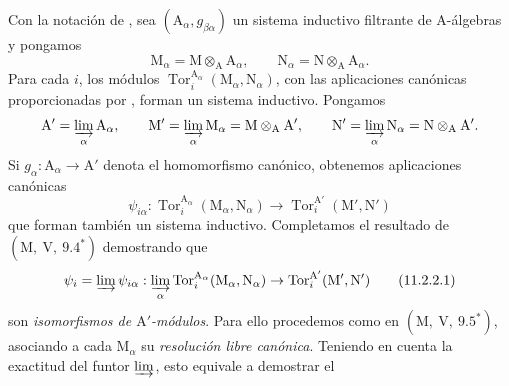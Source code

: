 \begin{env}[11.2.2]
\label{IV.11.2.2}
Con la notación de , sea
$(\mathrm{A}_\alpha,g_{\beta\alpha})$ un sistema inductivo filtrante de
$\mathrm{A}$-álgebras y pongamos
\[
  \mathrm{M}_\alpha=\mathrm{M}\otimes_\mathrm{A}\mathrm{A}_\alpha,
  \qquad
  \mathrm{N}_\alpha=\mathrm{N}\otimes_\mathrm{A}\mathrm{A}_\alpha.
\]
Para cada $i$, los módulos
$\operatorname{Tor}_i^{\mathrm{A}_\alpha}
(\mathrm{M}_\alpha,\mathrm{N}_\alpha)$, con las aplicaciones canónicas proporcionadas
por , forman un sistema inductivo. Pongamos
\[
  \mathrm{A}'=\varinjlim_\alpha\mathrm{A}_\alpha,\qquad
  \mathrm{M}'=\varinjlim_\alpha\mathrm{M}_\alpha
    =\mathrm{M}\otimes_\mathrm{A}\mathrm{A}',\qquad
  \mathrm{N}'=\varinjlim_\alpha\mathrm{N}_\alpha
    =\mathrm{N}\otimes_\mathrm{A}\mathrm{A}'.
\]
Si $g_\alpha:\mathrm{A}_\alpha\to\mathrm{A}'$ denota el homomorfismo
canónico, obtenemos aplicaciones canónicas
\[
  \psi_{i\alpha}:
  \operatorname{Tor}_i^{\mathrm{A}_\alpha}
    (\mathrm{M}_\alpha,\mathrm{N}_\alpha)
  \longrightarrow
  \operatorname{Tor}_i^{\mathrm{A}'}(\mathrm{M}',\mathrm{N}')
\]
que forman también un sistema inductivo. Completamos el resultado de
$(\mathrm{M},~\mathrm{V},~9.4^*)$ demostrando que
\begin{equation}
  \psi_i=\varinjlim\psi_{i\alpha}:\varinjlim_\alpha\operatorname{Tor}_i^{\mathrm{A}_\alpha}(\mathrm{M}_\alpha,\mathrm{N}_\alpha)\to\operatorname{Tor}_i^{\mathrm{A}'}(\mathrm{M}',\mathrm{N}')
  \label{IV.11.2.2.1}
\tag{11.2.2.1}
\end{equation}
son \emph{isomorfismos de $\mathrm{A}'$-módulos}. Para ello procedemos como en $(\mathrm{M},~\mathrm{V},~9.5^*)$, asociando a cada $\mathrm{M}_\alpha$ su \emph{resolución libre canónica}. Teniendo en cuenta la exactitud del funtor $\varinjlim$, esto equivale a demostrar el
\end{env}


